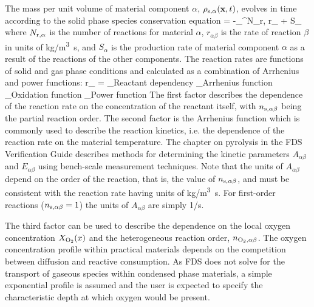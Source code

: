 The mass per unit volume of material component $\alpha$, $\rho_{\rm s,\alpha}({\mathbf{x}},t)$, evolves in time according to the solid phase species conservation equation
\be
    = -\sum_{}^{N_{\rm r,\alpha}} r_{\alpha \beta} + S_\alpha
  \label{solid_species_conservation}
\ee
where $N_{\rm r,\alpha}$ is the number of reactions for material $\alpha$, $r_{\alpha \beta}$ is the rate of reaction $\beta$ in units of \si{kg/m^3 s}, and $S_\alpha$ is the production rate of material component $\alpha$ as a result of the reactions of the other components. The reaction rates are functions of solid and gas phase conditions and calculated as a combination of Arrhenius and power functions:
\be
r_{\alpha \beta} =
    _\textrm{Reactant dependency}
    _\textrm{Arrhenius function}
    _\textrm{Oxidation function}
    _\textrm{Power function}
   \label{Arrhenius}
\ee
The first factor describes the dependence of the reaction rate on the concentration of the reactant itself, with $n_{\rm s,\alpha\beta}$ being the partial reaction order. The second factor is the Arrhenius function which is commonly used to describe the reaction kinetics, i.e. the dependence of the reaction rate on the material temperature. The chapter on pyrolysis in the FDS Verification Guide describes methods for determining the kinetic parameters $A_{\alpha \beta}$ and $E_{\alpha\beta}$ using bench-scale measurement techniques.  Note that the units of $A_{\alpha \beta}$ depend on the order of the reaction, that is, the value of $n_{\rm s,\alpha\beta}$, and must be consistent with the reaction rate having units of \si{kg/m^3 s}.  For first-order reactions ($n_{\rm s,\alpha\beta}=1$) the units of $A_{\alpha \beta}$ are simply 1/s.

The third factor can be used to describe the dependence on the local oxygen concentration $X_{\rm O_2}(x)$ and the heterogeneous reaction order, $n_{\rm O_2,\alpha\beta}$. The oxygen concentration profile within practical materials depends on the competition between diffusion and reactive consumption. As FDS does not solve for the transport of gaseous species within condensed phase materials, a simple exponential profile is assumed and the user is expected to specify the characteristic depth at which oxygen would be present.

